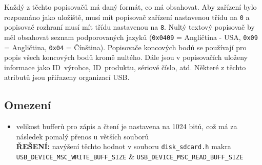 \documentclass[a4paper, 11pt]{article}
\begin{document}
Každý z těchto popisovačů má daný formát, co má obsahovat. Aby zařízení bylo rozpoznáno jako uložiště, musí mít popisovač zařízení nastavenou třídu na \texttt{0} a popisovač rozhraní musí mít třídu nastavenou na \texttt{8}. Nultý textový popisovač by měl obsahovat seznam podporovaných jazyků (\texttt{0x0409} = Angličtina - USA, \texttt{0x09} = Angličtina, \texttt{0x04} = Čínština). Popisovače koncových bodů se používají pro popis všech koncových bodů kromě nultého. Dále jsou v popisovačích uloženy informace jako ID~výrobce, ID~produktu, sériové číslo, atd. Některé z těchto atributů jsou přiřazeny organizací USB.


\subsection{Omezení}

\begin{itemize}
	\item velikost bufferů pro zápis a čtení je nastavena na 1024 bitů, což má za následek pomalý přenos u větších souborů \\ \textbf{ŘEŠENÍ:} navýšení těchto hodnot v souboru \texttt{disk\_sdcard.h} makra \linebreak \texttt{USB\_DEVICE\_MSC\_WRITE\_BUFF\_SIZE} \& \texttt{USB\_DEVICE\_MSC\_READ\_BUFF\_SIZE}
\end{itemize}



\pagebreak
\begin{flushleft}
\nocite{*}

\end{flushleft}
\end{document}
